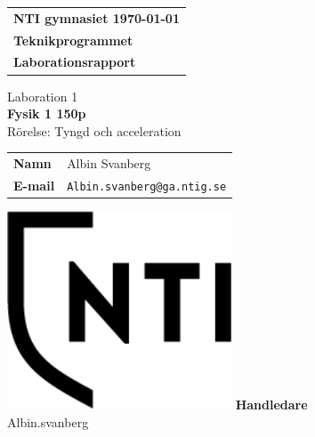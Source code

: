 \documentclass[11p, titlepage, oneside, a4paper]{article}
\makeatletter
\def\inst{Teknikprogrammet}
\def\typeofdoc{Laborationsrapport}
\def\course{Fysik 1 150p}
\def\pretitle{Laboration 1}
\def\title{Rörelse: Tyngd och acceleration}
\def\name{Albin Svanberg}
\def\username{Albin.svanberg}
\def\email{\username{}@ga.ntig.se}
\def\graders{Albin.svanberg}
\makeatother
\begin{document}
\begin{titlepage}
		\thispagestyle{empty}
		\begin{large}
			\begin{tabular}{@{}p{\textwidth}@{}}
				\textbf{NTI gymnasiet \hfill \today} \\
				\textbf{\inst} \\
				\textbf{\typeofdoc} \\
			\end{tabular}
		\end{large}
		\vspace{10mm}
		\begin{center}
			\LARGE{\pretitle} \\
			\huge{\textbf{\course}}\\
			\vspace{10mm}
			\LARGE{\title} \\
			\vspace{15mm}
			\begin{large}
				\begin{tabular}{ll}
					\textbf{Namn} & \name \\
					\textbf{E-mail} & \texttt{\email} \\
				\end{tabular}
			\end{large}
			\vfill
            \includegraphics[width=0.5\textwidth]{images/NTI Gymnasiet_Symbol_print_svart.png}
			\vfill
            \large{\textbf{Handledare}}\\
			\mbox{\large{\graders}}
		\end{center}
	\end{titlepage}

    \begin{otherlanguage}{english}
	\begin{abstract}
        The point of the laboration was divided into two parts. One part was to measure how much a spring elongated depending on the weight and the other part was to measure at what point gravity overcome friction depending on the weight.
    \end{abstract}
    \end{otherlanguage}
	\tableofcontents
	
\end{document}
